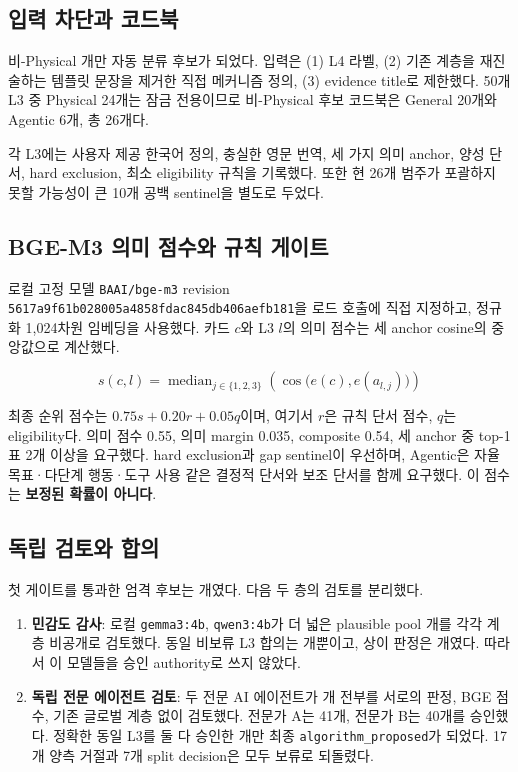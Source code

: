 \documentclass[11pt,a4paper]{article}
\newcommand{\code}[1]{\texttt{#1}}
\begin{document}
\subsection{입력 차단과 코드북}

비-Physical \NonPhysicalTotal{}개만 자동 분류 후보가 되었다. 입력은 (1) L4 라벨, (2) 기존 계층을 재진술하는 템플릿 문장을 제거한 직접 메커니즘 정의, (3) evidence title로 제한했다. 50개 L3 중 Physical 24개는 잠금 전용이므로 비-Physical 후보 코드북은 General 20개와 Agentic 6개, 총 26개다.

각 L3에는 사용자 제공 한국어 정의, 충실한 영문 번역, 세 가지 의미 anchor, 양성 단서, hard exclusion, 최소 eligibility 규칙을 기록했다. 또한 현 26개 범주가 포괄하지 못할 가능성이 큰 10개 공백 sentinel을 별도로 두었다.

\subsection{BGE-M3 의미 점수와 규칙 게이트}

로컬 고정 모델 \code{BAAI/bge-m3} revision \code{5617a9f61b028005a4858fdac845db406aefb181}을 로드 호출에 직접 지정하고, 정규화 1,024차원 임베딩을 사용했다. 카드 $c$와 L3 $l$의 의미 점수는 세 anchor cosine의 중앙값으로 계산했다.

\[
s(c,l)=\operatorname{median}_{j\in\{1,2,3\}}\left(\cos\bigl(e(c),e(a_{l,j})\bigr)\right)
\]

최종 순위 점수는 $0.75s+0.20r+0.05q$이며, 여기서 $r$은 규칙 단서 점수, $q$는 eligibility다. 의미 점수 0.55, 의미 margin 0.035, composite 0.54, 세 anchor 중 top-1 표 2개 이상을 요구했다. hard exclusion과 gap sentinel이 우선하며, Agentic은 자율 목표·다단계 행동·도구 사용 같은 결정적 단서와 보조 단서를 함께 요구했다. 이 점수는 \textbf{보정된 확률이 아니다}.

\subsection{독립 검토와 합의}

첫 게이트를 통과한 엄격 후보는 \InitialProposals{}개였다. 다음 두 층의 검토를 분리했다.

\begin{enumerate}
  \item \textbf{민감도 감사}: 로컬 \code{gemma3:4b}, \code{qwen3:4b}가 더 넓은 plausible pool \LocalReviewed{}개를 각각 계층 비공개로 검토했다. 동일 비보류 L3 합의는 \LocalSameNonNeeds{}개뿐이고, 상이 판정은 \LocalDisagreement{}개였다. 따라서 이 모델들을 승인 authority로 쓰지 않았다.
  \item \textbf{독립 전문 에이전트 검토}: 두 전문 AI 에이전트가 \InitialProposals{}개 전부를 서로의 판정, BGE 점수, 기존 글로벌 계층 없이 검토했다. 전문가 A는 41개, 전문가 B는 40개를 승인했다. 정확한 동일 L3를 둘 다 승인한 \ExpertBothApprove{}개만 최종 \code{algorithm\_proposed}가 되었다. 17개 양측 거절과 7개 split decision은 모두 보류로 되돌렸다.
\end{enumerate}
\end{document}
